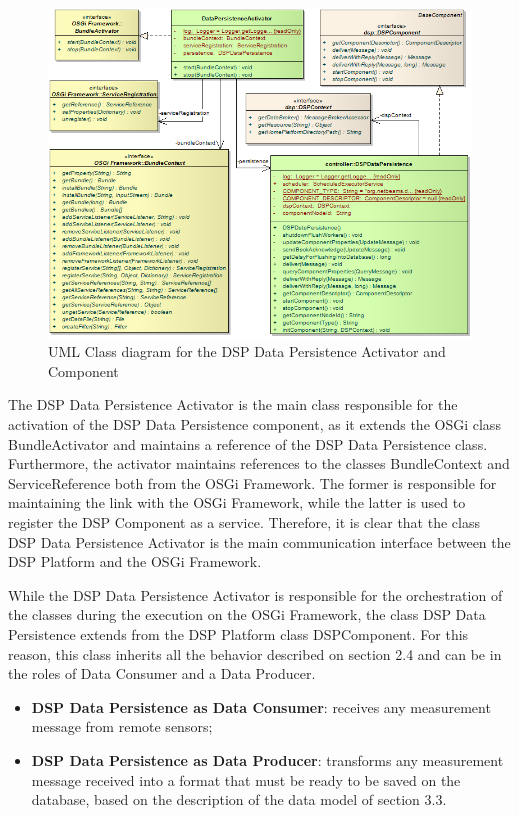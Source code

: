 \begin{figure}[!h]
  \centering
  \includegraphics[scale=0.5]{../diagrams/DSP-DataPersistence-Activator-Class-Diagram}
  \caption{UML Class diagram for the DSP Data Persistence Activator and Component}
  \label{fig:DSP-DataPersistence-Activator-Class-Diagram}
\end{figure}

The DSP Data Persistence Activator is the main class responsible for the
activation of the DSP Data Persistence component, as it extends the OSGi class
BundleActivator and maintains a reference of the DSP Data Persistence class.
Furthermore, the activator maintains references to the classes BundleContext
and ServiceReference both from the OSGi Framework. The former is responsible
for maintaining the link with the OSGi Framework, while the latter is used to
register the DSP Component as a service. Therefore, it is clear that the class
DSP Data Persistence Activator is the main communication interface between the
DSP Platform and the OSGi Framework.

While the DSP Data Persistence Activator is responsible for the orchestration
of the classes during the execution on the OSGi Framework, the class DSP Data
Persistence extends from the DSP Platform class DSPComponent. For this reason,
this class inherits all the behavior described on section 2.4 and can be in the
roles of Data Consumer and a Data Producer.

\begin{itemize}
  \item \textbf{DSP Data Persistence as Data Consumer}: receives any measurement
  message from remote sensors;
  \item \textbf{DSP Data Persistence as Data Producer}: transforms any
  measurement message received into a format that must be ready to be saved on the
  database, based on the description of the data model of section 3.3.
\end{itemize}

